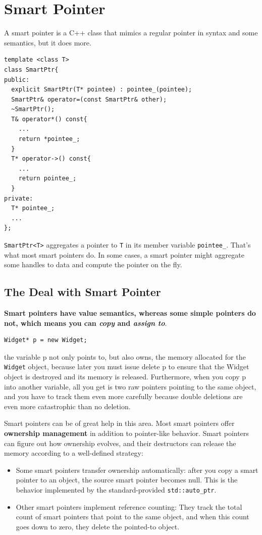 \newpage

\section{Smart Pointer}

A smart pointer is a C++ class that mimics a regular pointer in syntax
and some semantics, but it does more.
\begin{verbatim}
template <class T>
class SmartPtr{
public:
  explicit SmartPtr(T* pointee) : pointee_(pointee);
  SmartPtr& operator=(const SmartPtr& other);
  ~SmartPtr();
  T& operator*() const{
    ...
    return *pointee_;
  }
  T* operator->() const{
    ...
    return pointee_;
  }
private:
  T* pointee_;
  ...
};
\end{verbatim}

\texttt{SmartPtr<T>} aggregates a pointer to \texttt{T} in its member
variable \texttt{pointee\_}. That's what most smart pointers do. In
some cases, a smart pointer might aggregate some handles to data and
compute the pointer on the fly.

\subsection{The Deal with Smart Pointer}

\textbf{Smart pointers have value semantics, whereas some simple
pointers do not, which means you can \emph{copy} and \emph{assign
  to}}.

\begin{verbatim}
Widget* p = new Widget;
\end{verbatim}
the variable p not only points to, but also owns, the memory allocated
for the \texttt{Widget} object, because later you must issue delete p
to ensure that the Widget object is destroyed and its memory is 
released. Furthermore, when you copy p into another variable, all you
get is two raw pointers pointing to the same object, and you have to
track them even more carefully because double deletions are even more
catastrophic than no deletion.

Smart pointers can be of great help in this area. Most smart pointers
offer \textbf{ownership management} in addition to pointer-like
behavior. Smart pointers can figure out how ownership evolves, and their
destructors can release the memory according to a well-defined
strategy:
\begin{itemize}
\item Some
smart pointers transfer ownership automatically: after you copy a
smart pointer to an object, the source smart pointer becomes
null. This is the behavior implemented by the standard-provided
\texttt{std::auto\_ptr}.
\item Other smart pointers implement reference counting: They track
  the total count of smart pointers that point to the same object, and
  when this count goes down to zero, they delete the pointed-to object.
\end{itemize}

